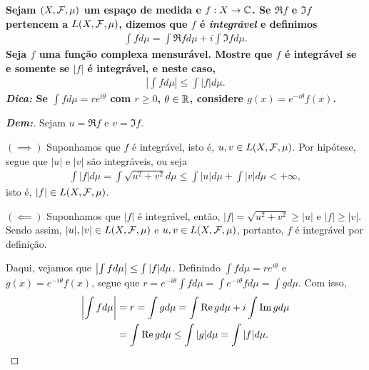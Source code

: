 \textbf{Sejam $(X, \mathcal F, \mu)$ um espaço de medida e $f: X \rightarrow \mathbb C$. 
Se $\Re f$ e $\Im f$ pertencem a $L(X, \mathcal F, \mu)$, dizemos que $f$ é \textit{integrável}
e definimos 
\begin{align*}
  \int f d\mu = \int \Re f d\mu +i\int \Im f d\mu.
\end{align*}
Seja $f$ uma função complexa mensurável. Mostre que $f$ é integrável se 
e somente se $|f|$ é integrável, e neste caso, 
\begin{align*}
  \left| \int f d\mu \right| \le \int |f| d\mu.
\end{align*}
\textit{Dica:} Se $\int f d\mu = re^{i\theta}$ com $r \ge 0$, $\theta \in \mathbb R$,
considere $g(x) = e^{-i\theta}f(x)$.
}
\begin{proof}[\textbf{Dem:}] Sejam $u = \Re f$ e $v = \Im f$. 

  \noindent
  $(\implies)$ Suponhamos que $f$ é integrável, isto é, $u, v \in L(X, \mathcal F, \mu)$.
  Por hipótese, segue que $|u|$ e $|v|$ são integráveis, ou seja 
  \begin{align*}
    \int |f| d\mu = \int \sqrt{u^2 + v^2} d\mu \le \int |u| d\mu + \int |v| d\mu < +\infty, 
  \end{align*}
  isto é, $|f| \in L(X, \mathcal F, \mu)$.

  \noindent 
  $(\impliedby)$ Suponhamos que $|f|$ é integrável, então, $|f| = \sqrt{u^2 +v^2} \ge |u|$
  e $|f| \ge |v|$. Sendo assim, $|u|, |v| \in L(X, \mathcal F, \mu)$ e 
  $u, v \in L(X, \mathcal F, \mu)$, portanto, $f$ é integrável por definição.

  Daqui, vejamos que $\left|\int f d\mu\right| \le \int |f| d\mu$. Definindo 
  $\int f d\mu = r e^{i\theta}$ e $g(x) = e^{-i\theta} f(x)$,
  segue que $r = e^{-i\theta}\int f d\mu = \int e^{-i\theta} fd\mu = \int g d\mu$. 
  Com isso, 
  \begin{align*}
    \left|\int f d\mu\right| &= r = \int g d\mu = \int \Re g d\mu + i\int \Im g d\mu \\
    &= \int \Re g d\mu \le \int |g| d\mu = \int |f| d\mu.
  \end{align*}
\end{proof}

